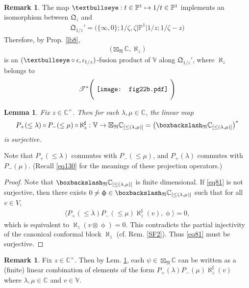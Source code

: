 \documentclass[11pt,b5paper,notitlepage]{article}
\theoremstyle{definition}
\newtheorem{rem}[df]{Remark}
\theoremstyle{plain}
\newtheorem{lm}[df]{Lemma}
\newcommand{\fk}{\mathfrak}
\newcommand{\Vbb}{\mathbb V}
\newcommand{\Cbb}{\mathbb C}
\newcommand{\Pbb}{\mathbb P}
\newcommand{\<}{\left\langle}
\renewcommand{\>}{\right\rangle}
\newcommand{\ST}{\mathscr{T}}
\newcommand{\bbs}{\boxbackslash}
\newcommand{\fn}{\mathfrak{N}}
\newcommand{\Lan}{{\big\langle}}
\newcommand{\Ran}{{\big\rangle}}
\newcommand{\tipath}{\text{\textbullseye}}
\numberwithin{equation}{section}
\begin{document}
\begin{rem}
The map $\tipath:t\in\Pbb^1\mapsto 1/t\in\Pbb^1$ implements an isomorphism between $\fk Q_z$ and
\begin{align*}
\fk Q_{1/z}'=\big(\{\infty,0\};1/\zeta,\zeta\big|\Pbb^1\big|1/z;1/\zeta-z\big)
\end{align*}
Therefore, by Prop. \ref{lb8},
\begin{align*}
\big(\boxtimes_\fn\Cbb,\aleph_z\big)
\end{align*}
is an $(\tipath\circ\epsilon,\iota_{1/z})$-fusion product of $\Vbb$ along $\fk Q_{1/z}'$, where $\aleph_z$ belongs to
\begin{align*}
\ST^*\Bigg(\vcenter{\hbox{{
			\texttt{[image: fig22b.pdf]}}}}~\Bigg)
\end{align*}
\end{rem}





\begin{lm}\label{lb24}
Fix $z\in\Cbb^\times$. Then for each $\lambda,\mu\in \Cbb$, the linear map
	\begin{gather}
		\label{eq81}P_+({\leq\lambda})\circ P_-({\leq\mu})\circ\aleph_z^\sharp:\Vbb\rightarrow \boxtimes_\fn\Cbb_{[\leq(\lambda,\mu)]}=\big(\bbs_\fn\Cbb_{[\leq(\lambda,\mu)]}\big)^*
	\end{gather}
	is surjective.
\end{lm}

Note that $P_+({\leq\lambda})$ commutes with $P_-({\leq\mu})$, and $P_+(\lambda)$ commutes with $P_-(\mu)$. (Recall \eqref{eq130} for the meanings of these projection operators.)


\begin{proof}
	Note that $\bbs_\fn\Cbb_{[\leq(\lambda,\mu)]}$ is finite dimensional. If \eqref{eq81} is not surjective, then there exists $0\ne \upphi\in \bbs_\fn\Cbb_{[\leq(\lambda,\mu)]}$ such that for all $v\in V$, 
	\begin{align*}
		\Lan P_+(\leq\lambda)P_-(\leq\mu)\aleph_z^\sharp(v),\upphi\Ran=0,
	\end{align*}
	which is equivalent to $\aleph_z(v\otimes \upphi)=0$. This contradicts the partial injectivity of the canonical conformal block $\aleph_z$ (cf. Rem. \ref{SF2}). Thus \eqref{eq81} must be surjective. 
\end{proof}


\begin{rem}\label{lb30}
Fix $z\in\Cbb^\times$. Then by Lem. \ref{lb24}, each $\psi\in \boxtimes_\fn\Cbb$ can be written as a (finite) linear combination of elements of the form $P_+(\lambda)P_-(\mu)\aleph_z^\sharp(v)$ where $\lambda,\mu\in \Cbb$ and $v\in \Vbb$.
\end{rem}
\end{document}
